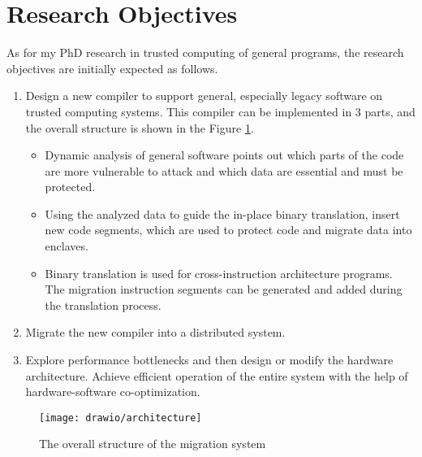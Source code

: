 \section{Research Objectives}
As for my PhD research in trusted computing of general programs, the research
objectives are initially expected as follows.
\begin{enumerate}[(1)]
    \item Design a new compiler to support general, especially legacy
    software on trusted computing systems. This compiler can be implemented
    in 3 parts, and the overall structure is shown in the Figure \ref{fig:arch}.
    \begin{itemize}
        \item Dynamic analysis of general software points out which parts of the code are
        more vulnerable to attack and which data are essential and must be protected.
        \item Using the analyzed data to guide the in-place binary translation,
        insert new code segments, which are used to protect code and migrate data into enclaves.
        \item Binary translation is used for cross-instruction architecture programs. The migration
        instruction segments can be generated and added during the translation process.
    \end{itemize}
    \item Migrate the new compiler into a distributed system.
    \item Explore performance bottlenecks and then design or modify the hardware architecture.
    Achieve efficient operation of the entire system with the help of hardware-software
    co-optimization.
\end{enumerate}

\begin{figure}
    \centering
    \texttt{[image: drawio/architecture]}
    \caption{The overall structure of the migration system}
    \label{fig:arch}
\end{figure}